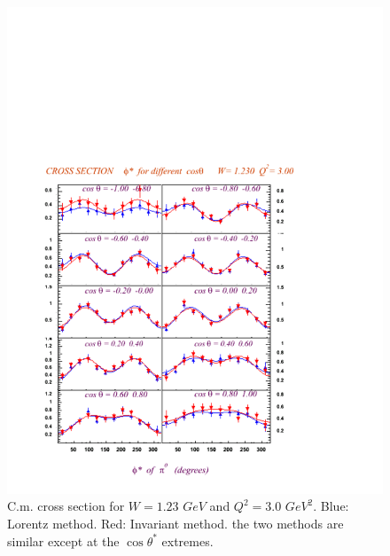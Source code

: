 \begin{figure}[h]
 \begin{center}
  \includegraphics[width = 12cm, bb = 0 20 480 540]{systematics/img/cro_phi_W1.23_Q23.00_mm0.080_ct0.95}
  \caption{C.m. cross section for $W=1.23$ $GeV$ and $Q^2=3.0$ $GeV^2$. Blue: Lorentz method. Red: Invariant method.
           the two methods are similar except at the $\cos\theta^*$ extremes. }
  \label{fig:cmthetacro}
 \end{center}
\end{figure} 
